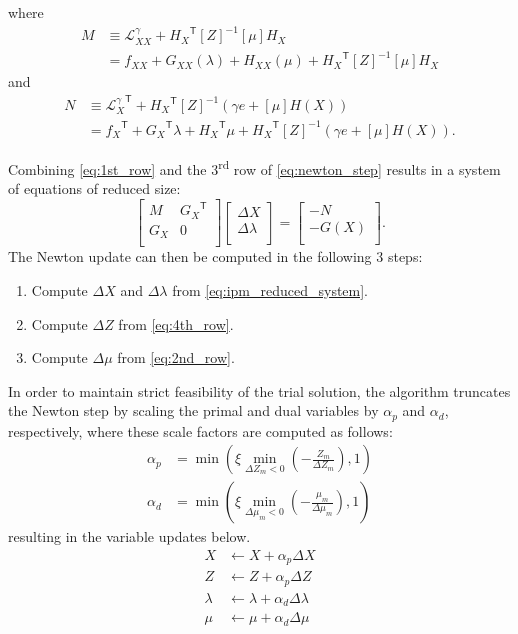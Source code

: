 \documentclass[12pt]{article}
\newcommand{\trans}[1]{{#1}^{\ensuremath{\mathsf{T}}}}  %
\newcommand{\diag}[1]{\left[{#1}\right]}                %
\numberwithin{equation}{section}
\numberwithin{table}{section}
\numberwithin{figure}{section}
\begin{document}
where
\begin{align}
M &\equiv \mathcal{L}^\gamma_{XX} + \trans{H_X} \diag{Z}^{-1} \diag{\mu} H_X  \\
  &= f_{XX} + G_{XX}(\lambda) + H_{XX}(\mu) + \trans{H_X} \diag{Z}^{-1} \diag{\mu} H_X
\end{align}
and
\begin{align}
N &\equiv \trans{\mathcal{L}^\gamma_X} + \trans{H_X} \diag{Z}^{-1} (\gamma e + \diag{\mu} H(X)) \\
  &= \trans{f_X} + \trans{G_X} \lambda + \trans{H_X} \mu + \trans{H_X} \diag{Z}^{-1} (\gamma e + \diag{\mu} H(X)).
\end{align}

Combining \eqref{eq:1st_row} and the 3\textsuperscript{rd} row of \eqref{eq:newton_step} results in a system of equations of reduced size:
\begin{equation}
\left[\begin{array}{cc}
M & \trans{G_X} \\
G_X & 0 \\
\end{array}\right]
\left[\begin{array}{c}
\Delta X \\
\Delta \lambda \\
\end{array}\right]
= \left[\begin{array}{c}
-N \\
-G(X) \\
\end{array}\right]. \label{eq:ipm_reduced_system}
\end{equation}
The Newton update can then be computed in the following 3 steps:

\begin{enumerate}
\item Compute $\Delta X$ and $\Delta \lambda$ from \eqref{eq:ipm_reduced_system}.
\item Compute $\Delta Z$ from \eqref{eq:4th_row}.
\item Compute $\Delta \mu$ from \eqref{eq:2nd_row}.
\end{enumerate}

In order to maintain strict feasibility of the trial solution, the algorithm truncates the Newton step by scaling the primal and dual variables by $\alpha_p$ and $\alpha_d$, respectively, where these scale factors are computed as follows:
\begin{align}
\alpha_p &= \min \left(\xi \min_{\Delta Z_m < 0} \left(-\frac{Z_m}{\Delta Z_m}\right), 1 \right)  \label{eq:alphap} \\
\alpha_d &= \min \left(\xi \min_{\Delta \mu_m < 0} \left(-\frac{\mu_m}{\Delta \mu_m}\right), 1 \right)  \label{eq:alphad}
\end{align}
resulting in the variable updates below.
\begin{align}
X &\gets X + \alpha_p \Delta X  \\
Z &\gets Z + \alpha_p \Delta Z  \\
\lambda &\gets \lambda + \alpha_d \Delta \lambda  \\
\mu &\gets \mu + \alpha_d \Delta \mu
\end{align}
\end{document}
